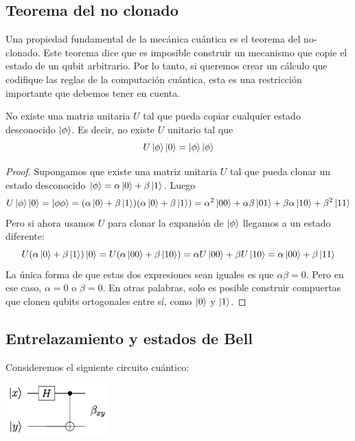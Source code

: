 \subsection{Teorema del no clonado}
Una propiedad fundamental de la mecánica cuántica es el teorema del no-clonado. Este teorema dice que es imposible construir un mecanismo que copie el estado de un qubit arbitrario. Por lo tanto, si queremos crear un cálculo que codifique las reglas de la computación cuántica, esta es una restricción importante que debemos tener en cuenta.

\begin{theorem}\label{thm:no-cloning}
  No existe una matriz unitaria \( U \) tal que pueda copiar cualquier estado desconocido \( \ket{\phi} \). Es decir, no existe \( U \) unitario tal que
  \[
    U \ket{\phi} \ket{0} = \ket{\phi} \ket{\phi}
  \]
\end{theorem}

\begin{proof}
  Supongamos que existe una matriz unitaria \( U \) tal que pueda clonar un estado desconocido \( \ket{\phi} = \alpha \ket{0} + \beta \ket{1} \). Luego
  \[
    U \ket{\phi} \ket{0} = \ket{\phi \phi} = (\alpha \ket{0} + \beta \ket{1})(\alpha \ket{0} + \beta \ket{1}) = \alpha^2 \ket{00} + \alpha \beta \ket{01} + \beta \alpha \ket{10} + \beta^2 \ket{11}
  \]
  Pero si ahora usamos \( U \) para clonar la expansión de \( \ket{\phi} \) llegamos a un estado diferente:
  \[
    U (\alpha \ket{0} + \beta \ket{1}) \ket{0}
    = U (\alpha \ket{00} + \beta \ket{10})
    = \alpha U \ket{00} + \beta U \ket{10}
    = \alpha \ket{00} + \beta \ket{11}
  \]
  La única forma de que estas dos expresiones sean iguales es que \( \alpha \beta = 0 \). Pero en ese caso, \( \alpha = 0 \) o \( \beta = 0 \). En otras palabras, solo es posible construir compuertas que clonen qubits ortogonales entre sí, como \( \ket{0} \) y \( \ket{1} \).
\end{proof}

\subsection{Entrelazamiento y estados de Bell}

Consideremos el siguiente circuito cuántico:

\begin{center}
  \includegraphics[width=4cm]{Figures/bell}
\end{center}

